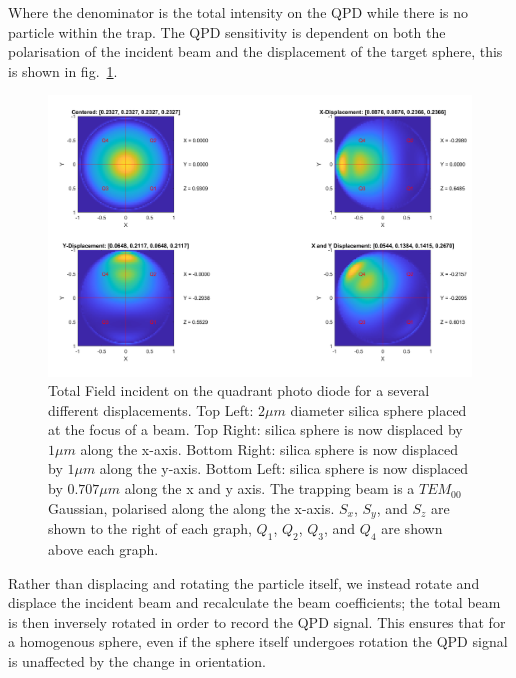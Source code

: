 Where the denominator is the total intensity on the QPD while there is 
no particle within the trap. The QPD sensitivity is dependent on both 
the polarisation of the incident beam and the displacement of the target 
sphere, this is shown in fig.~\ref{fig:totalfield}.
\begin{figure}[h!]
	\centering
	\includegraphics[width=0.85\linewidth]{fixed_polarisation.png}
	\captionsetup{margin=0.5cm}
	\caption{Total Field incident on the quadrant photo diode for a several different displacements. Top Left: $2\mu m $ diameter silica sphere placed at the focus of a  beam. Top Right: silica sphere is now displaced by $1 \mu m$ along the x-axis. Bottom Right: silica sphere is now displaced by $1 \mu m$ along the y-axis. Bottom Left: silica sphere is now displaced by $0.707 \mu m$ along the x and y axis. The trapping beam is a $TEM_{00}$ Gaussian, polarised along the along the x-axis. $S_x$, $S_y$, and $S_z$ are shown to the right of each graph, $Q_1$, $Q_2$, $Q_3$, and $Q_4$ are shown above each graph.}
	\label{fig:totalfield}
\end{figure}

Rather than displacing and rotating the particle itself, we instead rotate 
and displace the incident beam and recalculate the beam coefficients; the 
total beam is then inversely rotated in order to record the QPD signal. This
ensures that for a homogenous sphere, even if the sphere itself undergoes
rotation the QPD signal is unaffected by the change in orientation.

